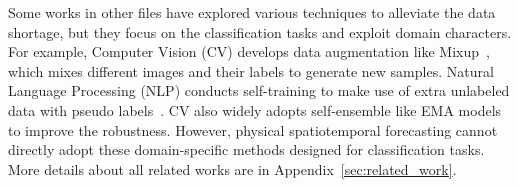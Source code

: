 



Some works in other files have explored various techniques to alleviate the data shortage, but they focus on the classification tasks and exploit domain characters.
For example, Computer Vision (CV) develops data augmentation like Mixup~\cite{zhang2017mixup}, which mixes different images and their labels to generate new samples. 
Natural Language Processing (NLP) conducts self-training to make use of extra unlabeled data with pseudo labels~\cite{du2020self}.
CV also widely adopts self-ensemble like EMA models~\cite{wang2022self} to improve the robustness.
However, physical spatiotemporal forecasting cannot directly adopt these domain-specific methods designed for classification tasks. More details about all related works are in Appendix~\ref{sec:related_work}.

